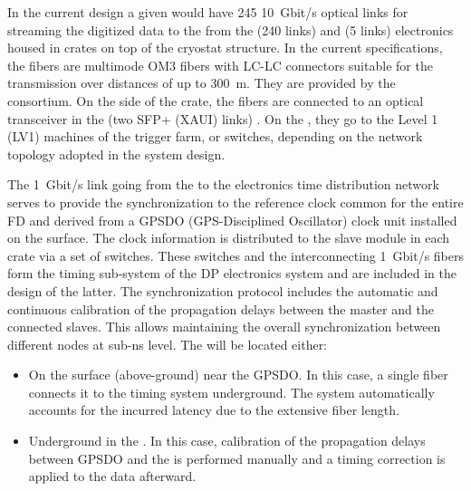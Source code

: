 In the current design 
a given  would have \num{245} \SI{10}{Gbit/s} optical links for streaming the digitized data to the  from the  (\num{240} links) and  (\num{5} links) electronics housed in  crates on top of the cryostat structure.  In the current specifications, the fibers are multimode OM3 fibers \cite{om3fibers} with LC-LC connectors suitable for the transmission over distances of up to \SI{300}{\metre}.  They are provided by the  consortium. On the side of the  crate, the fibers are connected to an optical transceiver in the  (two SFP+ (XAUI) links) \cite{natmch}.  On the , they go to the Level 1 (LV1) machines of the trigger farm, or switches, depending on the network topology adopted in the  system design.

The \SI{1}{Gbit/s} link going from the  to the \dual electronics time distribution network serves to provide the synchronization to the reference clock common for the entire FD and derived from a GPSDO (GPS-Disciplined Oscillator) clock unit installed on the surface. The clock information is distributed to the  slave module in each  crate via a set of  switches. These switches and the interconnecting \SI{1}{Gbit/s} fibers form the timing sub-system of the DP electronics system and are included in the design of the latter. The  synchronization protocol includes the automatic and continuous calibration of the propagation delays between the master and the connected slaves. This allows maintaining the overall synchronization between different nodes at sub-ns level. The  %
will be located either:
\begin{itemize}
\item{On the surface (above-ground) near the GPSDO. In this case, a single fiber connects it to the \dual timing system underground. %
The system automatically accounts for the incurred latency due to the extensive 
 fiber length.}
\item{Underground in the . In this case, calibration of the propagation delays between GPSDO and the  is performed manually and a timing correction %
is applied to the data afterward.}
\end{itemize} 

